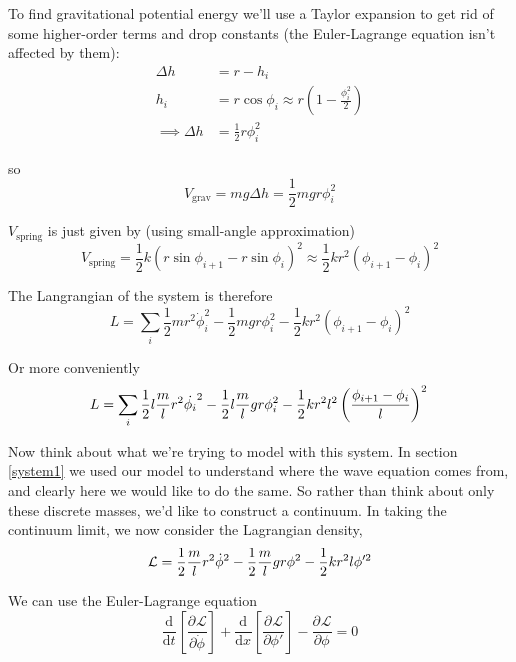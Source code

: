 \documentclass[12pt]{article}
\def\D{\mathrm{d}}
\newcommand{\diff}[3][]{\ensuremath{\frac{\D^{#1} #2}{\D #3^{#1}}}}
\newcommand{\partials}[3][]{\ensuremath{\frac{\partial^{#1} {#2}}{\partial {#3}^{#1}}}}
\begin{document}
To find gravitational potential energy we'll use a Taylor expansion to get rid of some higher-order terms and drop constants (the Euler-Lagrange equation isn't affected by them):
\begin{align*}
	\Delta h &= r - h_i\\
	h_i &= r\cos\phi_i \approx r\left(1 - \frac{\phi_i^2}{2}\right)\\
	\implies \Delta h &= \frac{1}{2}r\phi_i^2
\end{align*}

so
\begin{equation*}
	V_{\text{grav}} = mg\Delta h = \frac{1}{2}mgr\phi_i^2
\end{equation*}

$V_{\text{spring}}$ is just given by (using small-angle approximation)
\begin{equation*}
	V_{\text{spring}} = \frac{1}{2}k(r\sin\phi_{i+1} - r\sin\phi_i)^2 \approx \frac{1}{2}kr^2(\phi_{i+1} - \phi_i)^2
\end{equation*}

The Langrangian of the system is therefore
\begin{equation*}
	L = \sum_i\frac{1}{2}mr^2\dot{\phi}_i^2 - \frac{1}{2}mgr\phi_i^2 - \frac{1}{2}kr^2(\phi_{i+1} - \phi_i)^2
\end{equation*}

Or more conveniently
\begin{equation}
	L = \sum_i\frac{1}{2}l\frac{m}{l}r^2\dot{\phi_i}^2 - \frac{1}{2}l\frac{m}{l}gr\phi_i^2 - \frac{1}{2}kr^2l^2\left(\frac{\phi_{i+1} - \phi_i}{l}\right)^2\\
\end{equation}

Now think about what we're trying to model with this system. In section \ref{system1} we used our model to understand where the wave equation comes from, and clearly here we would like to do the same. So rather than think about only these discrete masses, we'd like to construct a continuum. In taking the continuum limit, we now consider the Lagrangian density,
\begin{equation*}
	\mathcal{L} = \frac{1}{2}\frac{m}{l}r^2\dot{\phi}^2 - \frac{1}{2}\frac{m}{l}gr\phi^2 - \frac{1}{2}kr^2l\phi'^2\\
\end{equation*}

We can use the Euler-Lagrange equation
\begin{equation}
	\diff{}{t}\left[\partials{\mathcal{L}}{\dot{\phi}}\right] + \diff{}{x}\left[\partials{\mathcal{L}}{\phi'}\right] - \partials{\mathcal{L}}{\phi} = 0
\end{equation}
\end{document}
